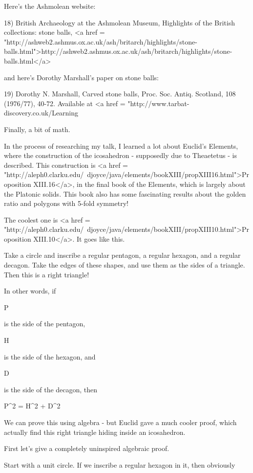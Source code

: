 Here's the Ashmolean website:

18) British Archaeology at the Ashmolean Museum, Highlights of the 
British collections: stone balls, 
<a href = "http://ashweb2.ashmus.ox.ac.uk/ash/britarch/highlights/stone-balls.html">http://ashweb2.ashmus.ox.ac.uk/ash/britarch/highlights/stone-balls.html</a>

and here's Dorothy Marshall's paper on stone balls:

19) Dorothy N. Marshall, Carved stone balls, Proc. Soc. Antiq. Scotland, 
108 (1976/77), 40-72.  Available at 
<a href = "http://www.tarbat-discovery.co.uk/Learning%

Finally, a bit of math.

In the process of researching my talk, I learned a lot about Euclid's
Elements, where the construction of the icosahedron - supposedly due
to Theaetetus - is described.  This construction is <a href =
"http://aleph0.clarku.edu/~djoyce/java/elements/bookXIII/propXIII16.html">Proposition
XIII.16</a>, in the final book of the Elements, which is largely about
the Platonic solids.  This book also has some fascinating results
about the golden ratio and polygons with 5-fold symmetry!

The coolest one is <a href =
"http://aleph0.clarku.edu/~djoyce/java/elements/bookXIII/propXIII10.html">Proposition
XIII.10</a>.  It goes like this.

Take a circle and inscribe a regular pentagon, a regular hexagon, and 
a regular decagon.   Take the edges of these shapes, and use them as the 
sides of a triangle.  Then this is a right triangle!

In other words, if

P

is the side of the pentagon, 

H 

is the side of the hexagon, and

D 

is the side of the decagon, then

P^{2} = H^{2} + D^{2}

We can prove this using algebra - but Euclid gave a much cooler proof,
which actually find this right triangle hiding inside an icosahedron.

First let's give a completely uninspired algebraic proof.

Start with a unit circle.  If we inscribe a regular hexagon in it, 
then obviously 


